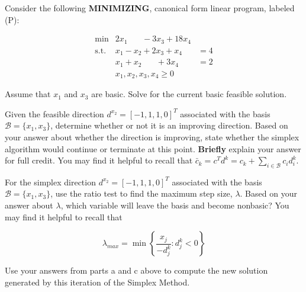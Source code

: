 
Consider the following {\bf MINIMIZING}, canonical form linear program, labeled (P):
\vspace{-2mm}

\begin{equation}
  \label{eq:1}
  \tag{P}
  \begin{array}{lll}
    \min & 2 x_1 \phantom{+ x_2} - 3 x_3 + 18 x_4 & \\
    \mbox{s.t.} & x_1 -  x_2 + 2 x_3 + x_4 & = 4 \\[1mm]
    & x_1 + x_2 \phantom{+ x_3} + 3 x_4 & = 2 \\
    & x_1, x_2, x_3, x_4 \geq 0 &
  \end{array}
\end{equation}



\begin{parts}
 Assume that $x_1$ and $x_3$ are basic.  Solve for the current basic feasible solution.


\vspace{4cm}


 Given the feasible direction $d^{x_2} = [-1, 1, 1, 0]^T$ associated with the basis $\mathcal{B} = \{x_1, x_3\}$, determine whether or not it is an improving direction.  Based on your answer about whether the direction is improving, state whether the simplex algorithm would continue or terminate at this point.  {\bf Briefly} explain your answer for full credit.  You may find it helpful to recall that $\bar c_k = c^T d^k = c_k + \sum_{i \in \mathcal{B}} c_i d_i^k$.

\vspace{3cm}

 For the simplex direction $d^{x_2} = [-1, 1, 1, 0]^T$ associated with the basis $\mathcal{B} = \{x_1, x_3\}$, use the ratio test to find the maximum step size, $\lambda$.  Based on your answer about $\lambda$, which variable will leave the basis and become nonbasic?    You may find it helpful to recall that 

\[
\lambda_{max} = \min \left\{ \frac{x_j}{-d_j^k}:d_j^k < 0 \right\}
\]

\vspace{3cm}

 Use your answers from parts a and c above to compute the new solution generated by this iteration of the Simplex Method. 

\vfill

\end{parts}

